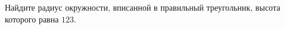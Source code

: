 \begin{ex}
	\begin{condition}
		Найдите радиус окружности, вписанной в правильный треугольник, высота которого равна \( 123 \).
	\end{condition}
\end{ex}